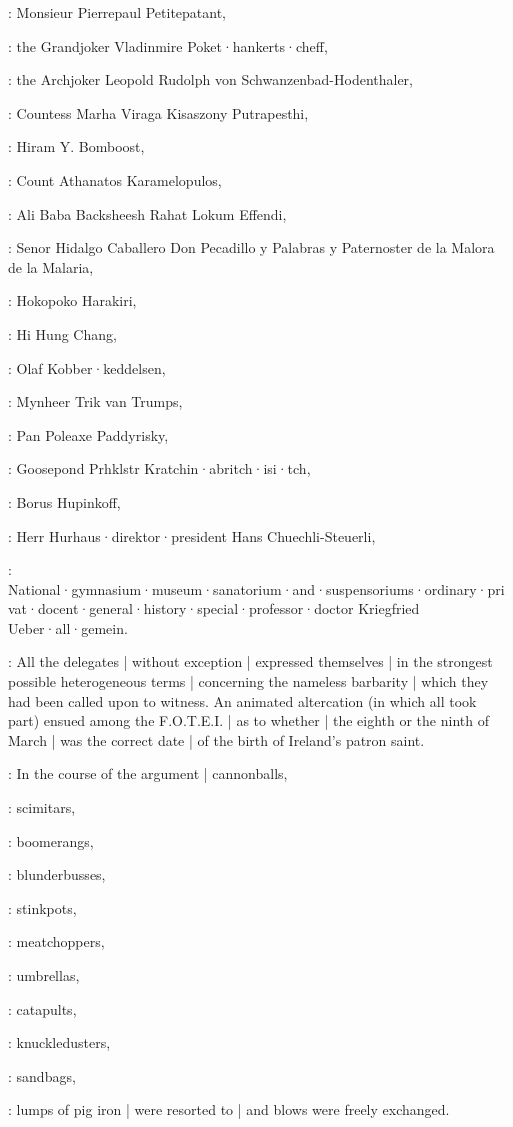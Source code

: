 :
Monsieur Pierrepaul Petitepatant,

:
the Grandjoker Vladinmire Poket·hankerts·cheff,

:
the Archjoker Leopold Rudolph von Schwanzenbad-Hodenthaler,

:
Countess Marha Viraga Kisaszony Putrapesthi,

:
Hiram Y. Bomboost,

:
Count Athanatos Karamelopulos,

:
Ali Baba Backsheesh Rahat Lokum Effendi,

:
Senor Hidalgo Caballero Don Pecadillo y Palabras y Paternoster de la Malora de la Malaria,

:
Hokopoko Harakiri,

:
Hi Hung Chang,

:
Olaf Kobber·keddelsen,

:
Mynheer Trik van Trumps,

:
Pan Poleaxe Paddyrisky,

:
Goosepond Prhklstr Kratchin·abritch·isi·tch,

:
Borus Hupinkoff,

:
Herr Hurhaus·direktor·president Hans Chuechli-Steuerli,

:
National·gymnasium·museum·sanatorium·and·suspensoriums·ordinary·privat·docent·general·history·special·professor·doctor
Kriegfried Ueber·all·gemein.

:
All the delegates |
without exception |
expressed themselves |
in the strongest possible heterogeneous terms |
concerning the nameless barbarity |
which they had been called upon to witness.
An animated altercation
(in which all took part)
ensued among the F.O.T.E.I. |
as to whether |
the eighth or the ninth of March |
was the correct date |
of the birth of Ireland's patron saint.

:
In the course of the argument |
cannonballs,

:
scimitars,

:
boomerangs,

:
blunderbusses,

:
stinkpots,

:
meatchoppers,

:
umbrellas,

:
catapults,

:
knuckledusters,

:
sandbags,

:
lumps of pig iron |
were resorted to |
and blows were freely exchanged.

